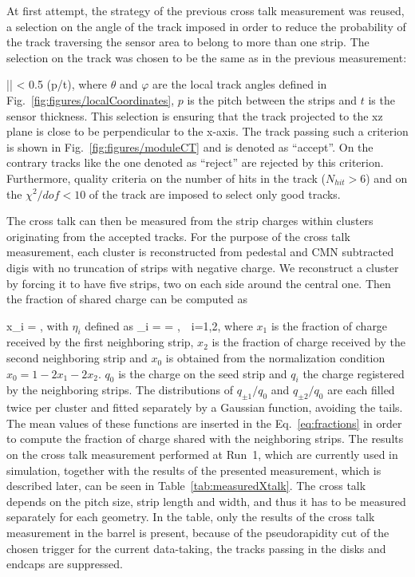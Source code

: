 At first attempt, the strategy of the previous cross talk measurement was reused, a selection on the angle of the track imposed in order to reduce the probability of the track traversing the sensor area to belong to more than one strip. The selection on the track was chosen to be the same as in the previous measurement:

{
|\tan \theta \cos \varphi| < 0.5 \times (p/t),
}
where $\theta$ and $\varphi$ are the local track angles defined in Fig.~\ref{fig:figures/localCoordinates}, $p$ is the pitch between the strips and $t$ is the sensor thickness. This selection is ensuring that the track projected to the xz plane is close to be perpendicular to the x-axis. The track passing such a criterion is shown in Fig.~\ref{fig:figures/moduleCT} and is denoted as ``accept''. On the contrary tracks like the one denoted as ``reject'' are rejected by this criterion. Furthermore, quality criteria on the number of hits in the track ($N_{hit}>6$) and on the $\chi^{2}/dof < 10$ of the track are imposed to select only good tracks. 

The cross talk can then be measured from the strip charges within clusters originating from the accepted tracks. For the purpose of the cross talk measurement, each cluster is reconstructed from pedestal and CMN subtracted digis with no truncation of strips with negative charge. We reconstruct a cluster by forcing it to have five strips, two on each side around the central one. Then the fraction of shared charge can be computed as


{
x_{i} =  ,
}
with $\eta_{i}$ defined as
{
\eta_{\pm i} =  =  ,~~i=1,2,
}
where $x_{1}$ is the fraction of charge received by the first neighboring strip,  $x_{2}$ is the fraction of charge received by the second neighboring strip and $x_{0}$ is obtained from the normalization condition $x_{0} = 1-2x_{1}-2x_{2}$. $q_{0}$ is the charge on the seed strip and $q_{i}$ the charge registered by the neighboring strips. The distributions of $q_{\pm 1}/q_{0}$ and $q_{\pm 2}/q_{0}$ are each filled twice per cluster and fitted separately by a Gaussian function, avoiding the tails. The mean values of these functions are inserted in the Eq.~\ref{eq:fractions} in order to compute the fraction of charge shared with the neighboring strips. The results on the cross talk measurement performed at Run~1, which are currently used in simulation, together with the results of the presented measurement, which is described later, can be seen in Table~\ref{tab:measuredXtalk}. The cross talk depends on the pitch size, strip length and width, and thus it has to be measured separately for each geometry. In the table, only the results of the cross talk measurement in the barrel is present, because of the pseudorapidity cut of the chosen trigger for the current data-taking, the tracks passing in the disks and endcaps are suppressed. 

